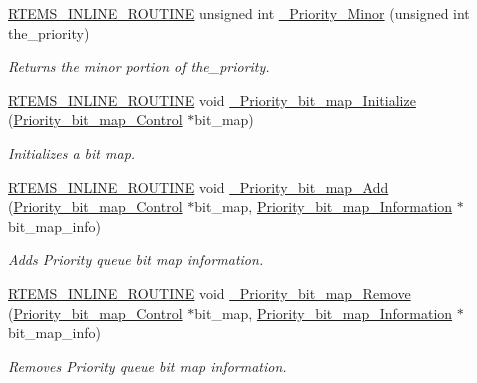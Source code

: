 \begin{DoxyCompactItemize}
\mbox{\hyperlink{group__RTEMSScoreBaseDefs_gac216239df231d5dbd15e3520b0b9313f}{R\+T\+E\+M\+S\+\_\+\+I\+N\+L\+I\+N\+E\+\_\+\+R\+O\+U\+T\+I\+NE}} unsigned int \mbox{\hyperlink{group__RTEMSScorePriority_gaaf7dd3dde9aa776f2c16fee4c1e572ed}{\+\_\+\+Priority\+\_\+\+Minor}} (unsigned int the\+\_\+priority)
\begin{DoxyCompactList}\small\item\em Returns the minor portion of the\+\_\+priority. \end{DoxyCompactList}\item 
\mbox{\hyperlink{group__RTEMSScoreBaseDefs_gac216239df231d5dbd15e3520b0b9313f}{R\+T\+E\+M\+S\+\_\+\+I\+N\+L\+I\+N\+E\+\_\+\+R\+O\+U\+T\+I\+NE}} void \mbox{\hyperlink{group__RTEMSScorePriority_gae1b3ddc145139b8cedba8169214f2dab}{\+\_\+\+Priority\+\_\+bit\+\_\+map\+\_\+\+Initialize}} (\mbox{\hyperlink{structPriority__bit__map__Control}{Priority\+\_\+bit\+\_\+map\+\_\+\+Control}} $\ast$bit\+\_\+map)
\begin{DoxyCompactList}\small\item\em Initializes a bit map. \end{DoxyCompactList}\item 
\mbox{\hyperlink{group__RTEMSScoreBaseDefs_gac216239df231d5dbd15e3520b0b9313f}{R\+T\+E\+M\+S\+\_\+\+I\+N\+L\+I\+N\+E\+\_\+\+R\+O\+U\+T\+I\+NE}} void \mbox{\hyperlink{group__RTEMSScorePriority_gaadf94736b9e458d8a92afbbfb2485e12}{\+\_\+\+Priority\+\_\+bit\+\_\+map\+\_\+\+Add}} (\mbox{\hyperlink{structPriority__bit__map__Control}{Priority\+\_\+bit\+\_\+map\+\_\+\+Control}} $\ast$bit\+\_\+map, \mbox{\hyperlink{structPriority__bit__map__Information}{Priority\+\_\+bit\+\_\+map\+\_\+\+Information}} $\ast$bit\+\_\+map\+\_\+info)
\begin{DoxyCompactList}\small\item\em Adds Priority queue bit map information. \end{DoxyCompactList}\item 
\mbox{\hyperlink{group__RTEMSScoreBaseDefs_gac216239df231d5dbd15e3520b0b9313f}{R\+T\+E\+M\+S\+\_\+\+I\+N\+L\+I\+N\+E\+\_\+\+R\+O\+U\+T\+I\+NE}} void \mbox{\hyperlink{group__RTEMSScorePriority_gab4a3b896e05ca0e5b2b1227e851447f8}{\+\_\+\+Priority\+\_\+bit\+\_\+map\+\_\+\+Remove}} (\mbox{\hyperlink{structPriority__bit__map__Control}{Priority\+\_\+bit\+\_\+map\+\_\+\+Control}} $\ast$bit\+\_\+map, \mbox{\hyperlink{structPriority__bit__map__Information}{Priority\+\_\+bit\+\_\+map\+\_\+\+Information}} $\ast$bit\+\_\+map\+\_\+info)
\begin{DoxyCompactList}\small\item\em Removes Priority queue bit map information. \end{DoxyCompactList}\item 

\end{DoxyCompactItemize}
